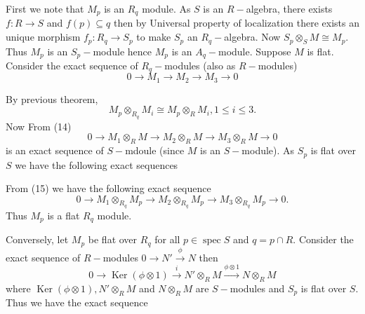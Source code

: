 \documentclass[11pt]{amsart}
\newcommand\isom{\mathrel{\stackon[-0.1ex]{\makebox*{\scalebox{1.08}{\AC}}{=\hfill\llap{=}}}{{\AC}}}}
\newcommand\nvisom{\rotatebox[origin=cc] {-90}{$ \isom $}}
\DeclareMathOperator{\Ker}{\text{Ker}}
\DeclareMathOperator{\spec}{\text{spec}}
\begin{document}
\proof First we note that $M_p$ is an $R_q$ module. As $S$ is an $R-$algebra, there exists $f:R\to S$ and $f(p)\subseteq q$ then by Universal property of localization there exists an unique morphism $f_p:R_q\to S_p$ to make $S_p$ an $R_q-$algebra. Now $S_p\otimes_S M\cong M_p$. Thus $M_p$ is an $S_p-$module hence $M_p$ is an $A_q-$module. Suppose $M$ is flat. Consider the exact sequence of $R_q-$modules (also as $R-$modules) \begin{equation}
0\to M_1\to M_2\to M_3\to 0
\end{equation}

By previous theorem, \begin{equation}
M_p\otimes_{R_q} M_i\cong M_p\otimes_R M_i,1\leq i\leq 3.
\end{equation} 
Now From (14) $$0\to M_1\otimes_R M\to M_2\otimes_R M\to M_3\otimes_R M\to 0$$ is an exact sequence of $S-$mdoule (since $M$ is an $S-$module). As $S_p$ is flat over $S$ we have the following exact sequences 

\begin{center}
\end{center}

From (15) we have the following exact sequence $$0\to M_1\otimes_{R_q} M_p\to M_2\otimes_{R_q} M_p\to M_3\otimes_{R_q} M_p\to 0.$$ Thus $M_p$ is a flat $R_q$ module.

 Conversely, let $M_p$ be flat over $R_q$ for all $p\in \spec S$ and $q=p\cap R.$ Consider the exact sequence of $R-$modules $0\to N'\xrightarrow{\phi} N$ then $$0\to\Ker(\phi\otimes 1)\xrightarrow{i}N'\otimes_R M\xrightarrow{\phi\otimes 1} N\otimes_R M$$ where $\Ker(\phi\otimes 1), N'\otimes_R M$ and $N\otimes_R M$ are $S-$modules and $S_p$ is flat over $S$. Thus we have the exact sequence 
 
\end{document}
